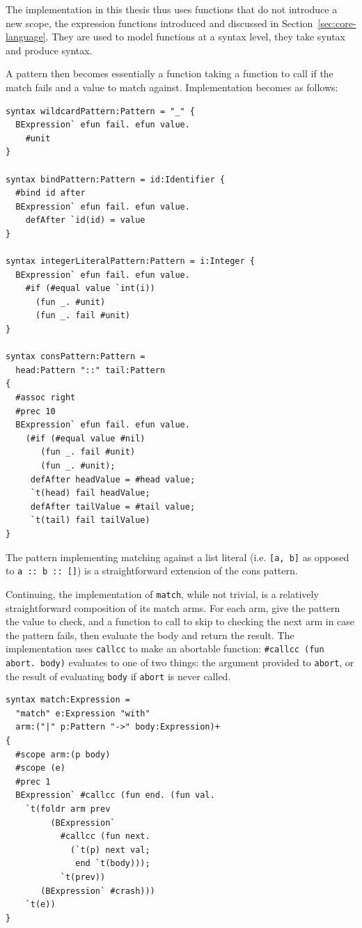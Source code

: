 \documentclass{kththesis}
\begin{document}
The implementation in this thesis thus uses functions that do not introduce a new scope, the expression functions introduced and discussed in Section~\ref{sec:core-language}. They are used to model functions at a syntax level, they take syntax and produce syntax.

A pattern then becomes essentially a function taking a function to call if the match fails and a value to match against. Implementation becomes as follows:

\begin{verbatim}
syntax wildcardPattern:Pattern = "_" {
  BExpression` efun fail. efun value.
    #unit
}

syntax bindPattern:Pattern = id:Identifier {
  #bind id after
  BExpression` efun fail. efun value.
    defAfter `id(id) = value
}

syntax integerLiteralPattern:Pattern = i:Integer {
  BExpression` efun fail. efun value.
    #if (#equal value `int(i))
      (fun _. #unit)
      (fun _. fail #unit)
}

syntax consPattern:Pattern =
  head:Pattern "::" tail:Pattern
{
  #assoc right
  #prec 10
  BExpression` efun fail. efun value.
    (#if (#equal value #nil)
       (fun _. fail #unit)
       (fun _. #unit);
     defAfter headValue = #head value;
     `t(head) fail headValue;
     defAfter tailValue = #tail value;
     `t(tail) fail tailValue)
}
\end{verbatim}

The pattern implementing matching against a list literal (i.e. \texttt{[a, b]} as opposed to \texttt{a :: b :: []}) is a straightforward extension of the cons pattern.

Continuing, the implementation of \texttt{match}, while not trivial, is a relatively straightforward composition of its match arms. For each arm, give the pattern the value to check, and a function to call to skip to checking the next arm in case the pattern fails, then evaluate the body and return the result. The implementation uses \texttt{callcc} to make an abortable function: \texttt{#callcc (fun abort. body)} evaluates to one of two things: the argument provided to \texttt{abort}, or the result of evaluating \texttt{body} if \texttt{abort} is never called.

\begin{verbatim}
syntax match:Expression =
  "match" e:Expression "with"
  arm:("|" p:Pattern "->" body:Expression)+
{
  #scope arm:(p body)
  #scope (e)
  #prec 1
  BExpression` #callcc (fun end. (fun val.
    `t(foldr arm prev
         (BExpression`
           #callcc (fun next.
             (`t(p) next val;
              end `t(body)));
           `t(prev))
       (BExpression` #crash)))
    `t(e))
}
\end{verbatim}
\end{document}
